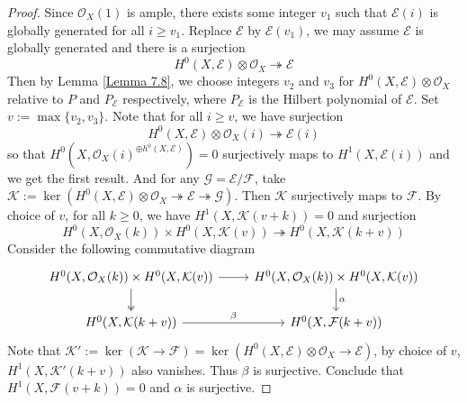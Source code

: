\documentclass{ctexart}
\begin{document}
\begin{proof}
    Since $\mathcal{O}_{X}(1)$ is ample, there exists some integer $v_{1}$ such that $\mathcal{E}(i)$ is globally generated for all $i \ge v_{1}$.
    Replace $\mathcal{E}$ by $\mathcal{E}(v_{1})$, we may assume $\mathcal{E}$ is globally generated and there is a surjection
    \begin{equation}
        H^{0}(X, \mathcal{E}) \otimes \mathcal{O}_{X} \twoheadrightarrow \mathcal{E}
    \end{equation}
    Then by Lemma \ref{Lemma 7.8}, we choose integers $v_{2}$ and $v_{3}$ for $H^{0}(X, \mathcal{E}) \otimes \mathcal{O}_{X}$ relative to $P$ and $P_{\mathcal{E}}$ respectively,
    where $P_{\mathcal{E}}$ is the Hilbert polynomial of $\mathcal{E}$.
    Set $v := \max \{v_{2}, v_{3}\}$.
    Note that for all $i \ge v$, we have surjection
    \begin{equation}
        H^{0}(X, \mathcal{E}) \otimes \mathcal{O}_{X}(i) \twoheadrightarrow \mathcal{E}(i)
    \end{equation}
    so that $H^{0}(X, \mathcal{O}_{X}(i)^{\oplus h^{0}(X, \mathcal{E})}) = 0$ surjectively maps to $H^{1}(X, \mathcal{E}(i))$ and we get the first result.
    And for any $\mathcal{G} = \mathcal{E}/\mathcal{F}$, take $\mathcal{K} := \ker (H^{0}(X, \mathcal{E}) \otimes \mathcal{O}_{X} \twoheadrightarrow \mathcal{E} \twoheadrightarrow \mathcal{G})$.
    Then $\mathcal{K}$ surjectively maps to $\mathcal{F}$.
    By choice of $v$, for all $k \ge 0$, we have $H^{1}(X, \mathcal{K}(v + k)) = 0$ and surjection
    \begin{equation}
        H^{0}(X, \mathcal{O}_{X}(k)) \times H^{0}(X, \mathcal{K}(v)) \twoheadrightarrow H^{0}(X, \mathcal{K}(k + v))
    \end{equation}
    Consider the following commutative diagram
    \begin{equation}
        \begin{tikzcd}
            H^{0}(X, \mathcal{O}_{X}(k)) \times H^{0}(X, \mathcal{K}(v)) \arrow[r] \arrow[d, twoheadrightarrow] &
            H^{0}(X, \mathcal{O}_{X}(k)) \times H^{0}(X, \mathcal{K}(v)) \arrow[d, "\alpha"] \\
            H^{0}(X, \mathcal{K}(k + v)) \arrow[r, "\beta"] &
            H^{0}(X, \mathcal{F}(k + v))
        \end{tikzcd}
    \end{equation}
    Note that $\mathcal{K}' := \ker (\mathcal{K} \rightarrow \mathcal{F}) = \ker (H^{0}(X, \mathcal{E}) \otimes \mathcal{O}_{X} \rightarrow \mathcal{E})$,
    by choice of $v$, $H^{1}(X, \mathcal{K}'(k + v))$ also vanishes.
    Thus $\beta$ is surjective.
    Conclude that $H^{1}(X, \mathcal{F}(v + k)) = 0$ and $\alpha$ is surjective.
\end{proof}
\end{document}
